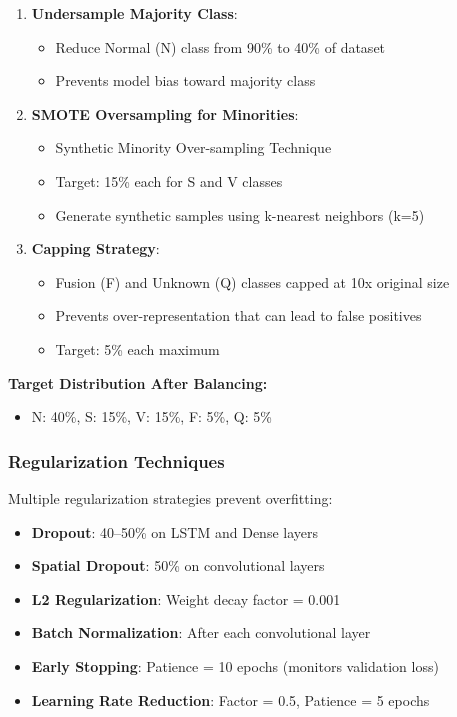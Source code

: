 \documentclass[12pt,a4paper]{article}
\begin{document}
\begin{enumerate}
    \item \textbf{Undersample Majority Class}:
    \begin{itemize}
        \item Reduce Normal (N) class from 90\% to 40\% of dataset
        \item Prevents model bias toward majority class
    \end{itemize}
    
    \item \textbf{SMOTE Oversampling for Minorities}:
    \begin{itemize}
        \item Synthetic Minority Over-sampling Technique
        \item Target: 15\% each for S and V classes
        \item Generate synthetic samples using k-nearest neighbors (k=5)
    \end{itemize}
    
    \item \textbf{Capping Strategy}:
    \begin{itemize}
        \item Fusion (F) and Unknown (Q) classes capped at 10x original size
        \item Prevents over-representation that can lead to false positives
        \item Target: 5\% each maximum
    \end{itemize}
\end{enumerate}

\textbf{Target Distribution After Balancing:}
\begin{itemize}
    \item N: 40\%, S: 15\%, V: 15\%, F: 5\%, Q: 5\%
\end{itemize}

\subsubsection{Regularization Techniques}

Multiple regularization strategies prevent overfitting:

\begin{itemize}
    \item \textbf{Dropout}: 40--50\% on LSTM and Dense layers
    \item \textbf{Spatial Dropout}: 50\% on convolutional layers
    \item \textbf{L2 Regularization}: Weight decay factor = 0.001
    \item \textbf{Batch Normalization}: After each convolutional layer
    \item \textbf{Early Stopping}: Patience = 10 epochs (monitors validation loss)
    \item \textbf{Learning Rate Reduction}: Factor = 0.5, Patience = 5 epochs
\end{itemize}
\end{document}
